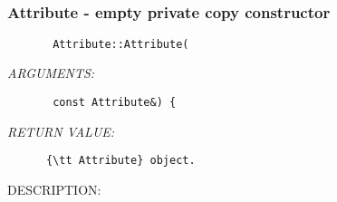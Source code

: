 
\setlength{\oldparskip}{\parskip}
\setlength{\parskip}{1.5ex}
\setlength{\oldparindent}{\parindent}
\setlength{\parindent}{0pt}
\setlength{\oldbaselineskip}{\baselineskip}
\setlength{\baselineskip}{11pt}
 
\def\bv{\begin{verbatim}}
\def\ev{\end{verbatim}}
\def\be{\begin{equation}}
\def\ee{\end{equation}}
\def\bea{\begin{eqnarray}}
\def\eea{\end{eqnarray}}
\def\bi{\begin{itemize}}
\def\ei{\end{itemize}}
\def\bn{\begin{enumerate}}
\def\en{\end{enumerate}}
\def\bd{\begin{description}}
\def\ed{\end{description}}
\def\({\left (}
\def\){\right )}
\def\[{\left [}
\def\]{\right ]}
\def\<{\left  \langle}
\def\>{\right \rangle}
\def\cI{{\cal I}}
\def\diag{\mathop{\rm diag}}
\def\tr{\mathop{\rm tr}}


 

  
 
\mbox{}\hrulefill\
 
\subsubsection [Attribute] {Attribute - empty private copy constructor}


  
\begin{verbatim}       Attribute::Attribute(\end{verbatim}{\em ARGUMENTS:}
\begin{verbatim}       const Attribute&) {
   \end{verbatim}{\em RETURN VALUE:}
\begin{verbatim}      {\tt Attribute} object.
   \end{verbatim}
{\sf DESCRIPTION:\\ }


